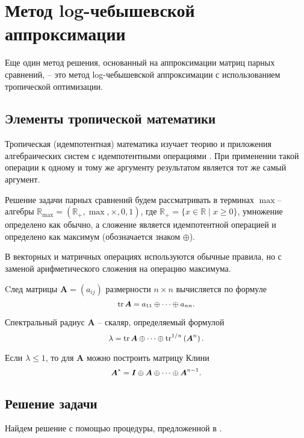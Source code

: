 \documentclass{math-mech-sci}
\begin{document}
\section{Метод log-чебышевской аппроксимации}

Еще один метод решения, основанный на аппроксимации матриц парных
сравнений, -- это метод 
log-чебышевской аппроксимации с использованием тропической оптимизации. 

\subsection{Элементы тропической математики}

Тропическая (идемпотентная) математика изучает теорию и приложения алгебраических систем с идемпотентными операциями \cite{Krivulin_tropic}. При применении такой операции к одному и тому же аргументу результатом является тот же самый аргумент. 

Решение задачи  парных сравнений будем рассматривать в терминах $\max$--алгебры $\mathbb{R}_{\max }=\left(\mathbb{R}_{+}, \max , \times, 0,1\right)$, где $\mathbb{R}_{+}=\{x \in \mathbb{R} \mid x \geqslant 0\}$, умножение определено как обычно, а сложение является идемпотентной операцией и определено как максимум (обозначается знаком $\oplus$). 

В векторных и матричных операциях используются обычные правила, но с заменой арифметического сложения на операцию максимума.

Cлед матрицы $\boldsymbol{A}=(a_{ij})$ размерности $n\times n$ вычисляется по формуле
$$
\small
\operatorname{tr} \boldsymbol{A}=a_{11} \oplus \cdots \oplus a_{n n} .
$$

Спектральный радиус $\boldsymbol{A}$ -- скаляр, определяемый формулой
$$
\small
\lambda=\operatorname{tr} \boldsymbol{A} \oplus \cdots \oplus \operatorname{tr}^{1 / n}\left(\boldsymbol{A}^n\right) .
$$

Если $\lambda \leqslant 1$, то для $\boldsymbol{A}$ можно построить матрицу  Клини
$$
\small
\boldsymbol{A}^*=\boldsymbol{I} \oplus \boldsymbol{A} \oplus \cdots \oplus \boldsymbol{A}^{n-1}. 
$$

\subsection{Решение задачи}

Найдем решение с помощью процедуры, предложенной в \cite{ Krivulin2019Tropical}.
\vspace{0.5ex}
\end{document}

